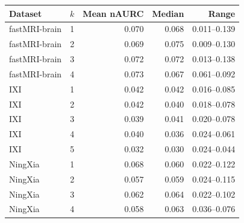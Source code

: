 \begin{tabular}{lrrrr}
\toprule
Dataset & $k$ & Mean nAURC & Median & Range \\
\midrule
fastMRI-brain & 1 & 0.070 & 0.068 & 0.011--0.139 \\
fastMRI-brain & 2 & 0.069 & 0.075 & 0.009--0.130 \\
fastMRI-brain & 3 & 0.072 & 0.072 & 0.013--0.138 \\
fastMRI-brain & 4 & 0.073 & 0.067 & 0.061--0.092 \\
IXI & 1 & 0.042 & 0.042 & 0.016--0.085 \\
IXI & 2 & 0.042 & 0.040 & 0.018--0.078 \\
IXI & 3 & 0.039 & 0.041 & 0.020--0.078 \\
IXI & 4 & 0.040 & 0.036 & 0.024--0.061 \\
IXI & 5 & 0.032 & 0.030 & 0.024--0.044 \\
NingXia & 1 & 0.068 & 0.060 & 0.022--0.122 \\
NingXia & 2 & 0.057 & 0.059 & 0.024--0.115 \\
NingXia & 3 & 0.062 & 0.064 & 0.022--0.102 \\
NingXia & 4 & 0.058 & 0.063 & 0.036--0.076 \\
\bottomrule
\end{tabular}

